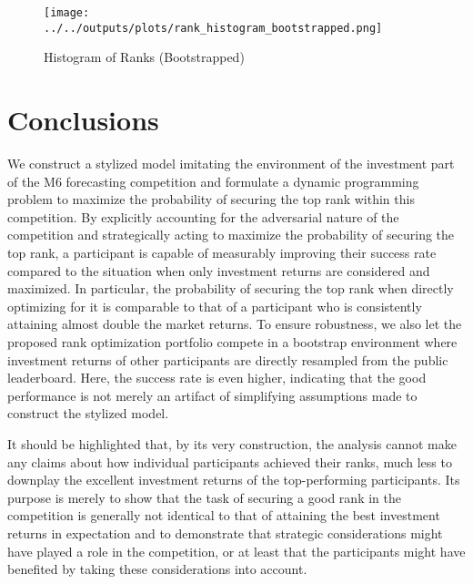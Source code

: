 \documentclass[3p,times,twocolumn]{elsarticle}
\begin{document}
\begin{figure}[!htbp]
    \centering
    \texttt{[image: ../../outputs/plots/rank\_histogram\_bootstrapped.png]}
    \caption{Histogram of Ranks (Bootstrapped)}
    \label{fig:rank_histogram_bootstrap}
\end{figure}

\section{Conclusions}\label{section:conclusions}

We construct a stylized model imitating the environment of the investment part of the M6 forecasting competition \citep{makridakisM6FinancialDuathlon2022} and formulate a dynamic programming problem to maximize the probability of securing the top rank within this competition.
By explicitly accounting for the adversarial nature of the competition and strategically acting to maximize the probability of securing the top rank, a participant is capable of measurably improving their success rate compared to the situation when only investment returns are considered and maximized.
In particular, the probability of securing the top rank when directly optimizing for it is comparable to that of a participant who is consistently attaining almost double the market returns.
To ensure robustness, we also let the proposed rank optimization portfolio compete in a bootstrap environment where investment returns of other participants are directly resampled from the public leaderboard.
Here, the success rate is even higher, indicating that the good performance is not merely an artifact of simplifying assumptions made to construct the stylized model.

It should be highlighted that, by its very construction, the analysis cannot make any claims about how individual participants achieved their ranks, much less to downplay the excellent investment returns of the top-performing participants.
Its purpose is merely to show that the task of securing a good rank in the competition is generally not identical to that of attaining the best investment returns in expectation and to demonstrate that strategic considerations might have played a role in the competition, or at least that the participants might have benefited by taking these considerations into account.
\end{document}
